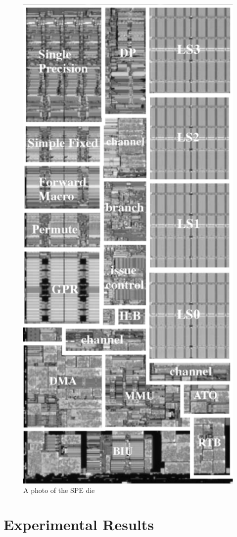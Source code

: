 \documentclass{sig-alternate-05-2015}
\begin{document}
\begin{figure}
\centering
\includegraphics[scale=0.4]{./spe}
\caption{A photo of the SPE die}
\label{spe_die}
\end{figure}

\section{Experimental Results}
\end{document}
